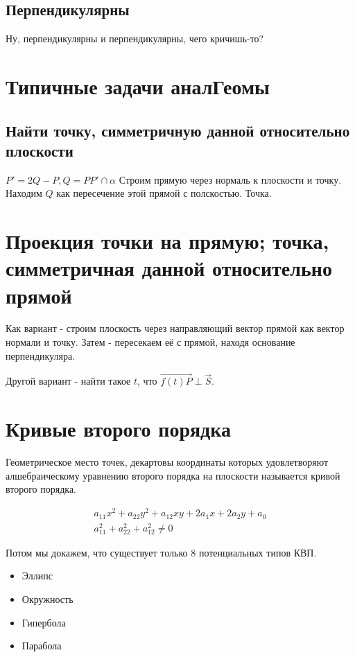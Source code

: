 \documentclass[12pt, a4paper]{article}
\begin{document}
    \subsection{Перпендикулярны}
    Ну, перпендикулярны и перпендикулярны, чего кричишь-то?

    \section{Типичные задачи аналГеомы}

    \subsection{Найти точку, симметричную данной относительно плоскости}

    $P' = 2Q - P, Q = PP' \cap \alpha$
    Строим прямую через нормаль к плоскости и точку. Находим $Q$ как пересечение этой прямой с полскостью. Точка.

    \section{Проекция точки на прямую; точка, симметричная данной относительно прямой}

    Как вариант - строим плоскость через направляющий вектор прямой как вектор нормали и точку.
    Затем - пересекаем её с прямой, находя основание перпендикуляра.

    Другой вариант - найти такое $t$, что $\overrightarrow{f(t)P} \perp \vec{S}$.


    \section{Кривые второго порядка}

    \begin{definition}

        Геометрическое место точек, декартовы координаты которых удовлетворяют алшебраическому уравнению второго порядка на плоскости называется кривой второго порядка.
    \end{definition}
    
    \begin{gather}
        a_{11} x^2 + a_{22} y^2 + a_{12} xy + 2a_1 x + 2 a_2 y + a_0 \\
        a_{11}^2 + a_{22}^2 + a_{12}^2 \neq 0
    \end{gather}


    Потом мы докажем, что существует только 8 потенциальных типов КВП.
    \begin{itemize}
        \item Эллипс
        \item Окружность
        \item Гипербола
        \item Парабола 
    \end{itemize}
\end{document}
